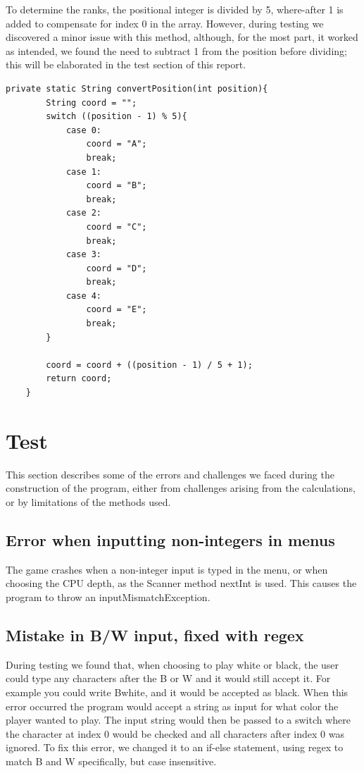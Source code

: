 \documentclass[12pt, a4paper]{article}
\begin{document}
	To determine the ranks, the positional integer is divided by 5, where-after 1 is added to compensate for index 0 in the array.
	However, during testing we discovered a minor issue with this method, although, for the most part, it worked as intended, we found the need to subtract 1 from the position before dividing; this will be elaborated in the test section of this report.
	
	\begin{lstlisting}[style=JavaStyle]
    private static String convertPosition(int position){
		String coord = "";
		switch ((position - 1) % 5){
			case 0:
				coord = "A";
				break;
			case 1:
				coord = "B";
				break;
			case 2:
				coord = "C";
				break;
			case 3:
				coord = "D";
				break;
			case 4:
				coord = "E";
				break;
		}
		
		coord = coord + ((position - 1) / 5 + 1);
		return coord;
	}
	\end{lstlisting}
	\vspace{10mm}

	\section{Test}
	This section describes some of the errors and challenges we faced during the construction of the program, either from challenges arising from the calculations, or by limitations of the methods used.
	
	\subsection{Error when inputting non-integers in menus}
	The game crashes when a non-integer input is typed in the menu, or when choosing the CPU depth, as the Scanner method nextInt is used. This causes the program to throw an inputMismatchException.
	
	\subsection{Mistake in B/W input, fixed with regex}
	During testing we found that, when choosing to play white or black, the user could type any characters after the B or W and it would still accept it. For example you could write Bwhite, and it would be accepted as black.
	When this error occurred the program would accept a string as input for what color the player wanted to play. The input string would then be passed to a switch where the character at index 0 would be checked and all characters after index 0 was ignored.
	To fix this error, we changed it to an if-else statement, using regex to match B and W specifically, but case insensitive.
	
\end{document}
